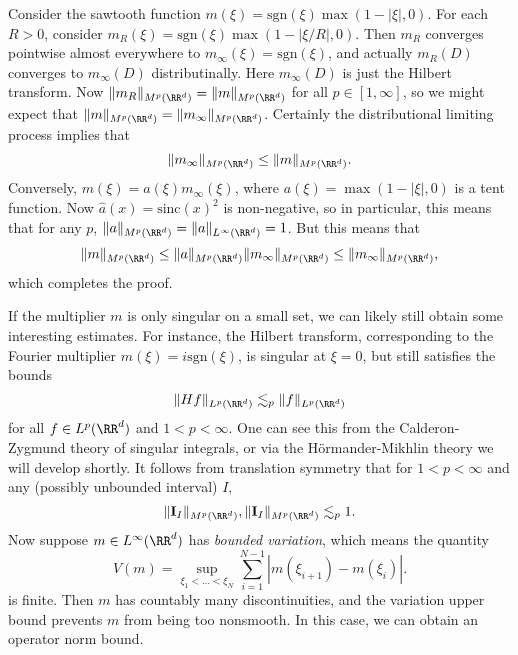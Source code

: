 \begin{example}
    Consider the sawtooth function $m(\xi) = \text{sgn}(\xi) \max(1 - |\xi|, 0)$. For each $R > 0$, consider $m_R(\xi) = \text{sgn}(\xi) \max(1 - |\xi/R|, 0)$. Then $m_R$ converges pointwise almost everywhere to $m_\infty(\xi) = \text{sgn}(\xi)$, and actually $m_R(D)$ converges to $m_\infty(D)$ distributinally. Here $m_\infty(D)$ is just the Hilbert transform. Now $\| m_R \|_{M^p(\RR^d)} = \| m \|_{M^p(\RR^d)}$ for all $p \in [1,\infty]$, so we might expect that $\| m \|_{M^p(\RR^d)} = \| m_\infty \|_{M^p(\RR^d)}$. Certainly the distributional limiting process implies that
    \[ \| m_\infty \|_{M^p(\RR^d)} \leq \| m \|_{M^p(\RR^d)}. \]
    Conversely, $m(\xi) = a(\xi) m_\infty(\xi)$, where $a(\xi) = \max(1 - |\xi|,0)$ is a tent function. Now $\widehat{a}(x) = \text{sinc}(x)^2$ is non-negative, so in particular, this means that for any $p$, $\| a \|_{M^p(\RR^d)} = \| a \|_{L^\infty(\RR^d)} = 1$. But this means that
    \[ \| m \|_{M^p(\RR^d)} \leq \| a \|_{M^p(\RR^d)} \| m_\infty \|_{M^p(\RR^d)} \leq \| m_\infty \|_{M^p(\RR^d)}, \]
    which completes the proof.
\end{example}

If the multiplier $m$ is only singular on a small set, we can likely still obtain some interesting estimates. For instance, the Hilbert transform, corresponding to the Fourier multiplier $m(\xi) = i \text{sgn}(\xi)$, is singular at $\xi = 0$, but still satisfies the bounds
%
\[ \| Hf \|_{L^p(\RR^d)} \lesssim_p \| f \|_{L^p(\RR^d)} \]
%
for all $f \in L^p(\RR^d)$ and $1 < p < \infty$. One can see this from the Calderon-Zygmund theory of singular integrals, or via the H\"{o}rmander-Mikhlin theory we will develop shortly. It follows from translation symmetry that for $1 < p < \infty$ and any (possibly unbounded interval) $I$,
%
\[ \| \mathbf{I}_{I} \|_{M^p(\RR^d)}, \| \mathbf{I}_{I} \|_{M^p(\RR^d)} \lesssim_p 1. \]
%
Now suppose $m \in L^\infty(\RR^d)$ has \emph{bounded variation}, which means the quantity
%
\[ V(m) = \sup_{\xi_1 < \dots < \xi_N} \sum_{i = 1}^{N-1} |m(\xi_{i+1}) - m(\xi_i)|. \]
%
is finite. Then $m$ has countably many discontinuities, and the variation upper bound prevents $m$ from being too nonsmooth. In this case, we can obtain an operator norm bound.


